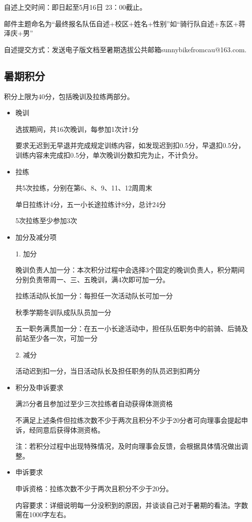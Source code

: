 \documentclass{ctexbook}
\begin{document}
自述上交时间：即日起至5月16日 23：00截止。

邮件主题命名为“最终报名队伍自述+校区+姓名+性别”如“骑行队自述+东区+蒋泽庆+男”

自述提交方式：发送电子版文档至暑期选拔公共邮箱sunnybikefromcau@163.com.

\subsection{暑期积分}

积分上限为40分，包括晚训及拉练两部分。

\begin{itemize}
    \item 晚训

 选拔期间，共16次晚训，每参加1次计1分

 要求无迟到无早退并完成规定训练内容，如发现迟到扣0.5分，早退扣0.5分，训练内容未完成扣0.5分，单次晚训分数扣完为止，不计负分。

\item 拉练

 共5次拉练，分别在第6、8、9、11、12周周末

 单日拉练计4分，五一小长途拉练计8分，总计24分

 5次拉练至少参加3次

\item 加分及减分项

1. 加分

 晚训负责人加一分：本次积分过程中会选择3个固定的晚训负责人，积分期间分别负责带周一、三、五晚训，满4次即可加一分。

 拉练活动队长加一分：每担任一次活动队长可加一分

 秋季学期冬训队成队队员加一分

 五一职务满贯加一分：在五一小长途活动中，担任队伍职务中的前骑、后骑及前站至少各一次，可加一分

2. 减分

 活动迟到扣一分，当日活动队长及担任职务的队员迟到扣两分

\item 积分及申诉要求

满25分者且参加过至少三次拉练者自动获得体测资格

不满足上述条件但拉练次数不少于两次且积分不少于20分者可向理事会提起申诉，经同意后获得体测资格。

注：若积分过程中出现特殊情况，及时向理事会反馈，会根据具体情况做出调整。

\item 申诉要求

申诉资格：拉练次数不少于两次且积分不少于20分。

内容要求：详细说明每一分没积到的原因，并谈谈自己对于暑期的看法。字数需在1000字左右。

\end{itemize}
\end{document}
